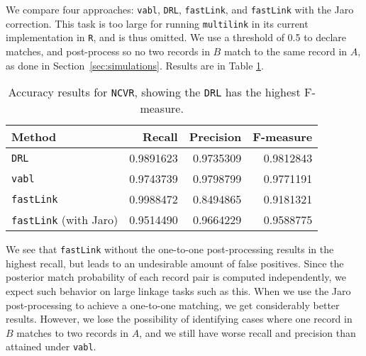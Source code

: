 \documentclass[12pt,letterpaper]{article}
\newcommand{\1}[1]{\mathbb{I}\!\left[#1\right]} %
\begin{document}
We compare four approaches: \texttt{vabl}, \texttt{DRL}, \texttt{fastLink}, and \texttt{fastLink} with the Jaro correction. This task is too large for running \texttt{multilink} in its current implementation in \texttt{R}, and is thus omitted. We use a threshold of 0.5 to declare matches, and post-process so no two records in $B$ match to the same record in $A$, as done in Section~\ref{sec:simulations}. Results are in Table \ref{table:ncvr_results}.

\begin{table}[t]
	\centering
	\begin{tabular}{l|rrr}
		Method & Recall & Precision & F-measure\\
		\hline
		\texttt{DRL} & 0.9891623 & 0.9735309 & 0.9812843\\
		\hline
		\texttt{vabl} & 0.9743739 & 0.9798799 & 0.9771191\\
		\hline
		\texttt{fastLink} & 0.9988472 & 0.8494865 & 0.9181321\\
		\hline
		\texttt{fastLink} (with Jaro) & 0.9514490 & 0.9664229 & 0.9588775\\
	\end{tabular}
	\caption{Accuracy results for \texttt{NCVR}, showing the \texttt{DRL} has the highest F-measure.}
	\label{table:ncvr_results}
\end{table}

We see that \texttt{fastLink} without the one-to-one post-processing results in the highest recall, but leads to an undesirable amount of false positives. Since the posterior match probability of each record pair is computed independently, we expect such behavior on large linkage tasks such as this. When we use the Jaro post-processing to achieve a one-to-one matching, we get considerably better results. However, we lose the possibility of identifying cases where one record in $B$ matches to two records in $A$, and we still have worse recall and precision than attained under \texttt{vabl}. 
\end{document}
